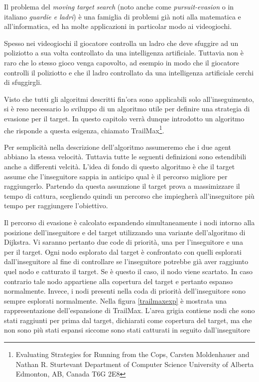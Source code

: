 \documentclass[12pt]{book}
\begin{document}
\par{Il problema del \emph{moving target search} (noto anche come \emph{pursuit-evasion} o in italiano \emph{guardie e ladri}) \`e una famiglia di problemi gi\`a noti alla matematica e all'informatica, ed ha molte applicazioni in particolar modo ai videogiochi.
}
\par{Spesso nei videogiochi il giocatore controlla un ladro che deve sfuggire ad un poliziotto a sua volta controllato da una intelligenza artificiale. Tuttavia non \`e raro che lo stesso gioco venga capovolto, ad esempio in modo che il giocatore controlli il poliziotto e che il ladro controllato da una intelligenza artificiale cerchi di sfuggirgli.}
\par{Visto che tutti gli algoritmi descritti fin'ora sono applicabili solo all'inseguimento, si \`e reso necessario lo sviluppo di un algoritmo utile per definire una strategia di evasione per il target. In questo capitolo verr\`a dunque introdotto un algoritmo che risponde a questa esigenza, chiamato TrailMax\footnote{Evaluating Strategies for Running from the Cops, Carsten Moldenhauer
and
Nathan R. Sturtevant
Department of Computer Science
University of Alberta
Edmonton, AB, Canada T6G 2E8}.
}\par{Per semplicit\`a nella descrizione dell'algoritmo assumeremo che i due agent abbiano la stessa velocit\`a. Tuttavia tutte le seguenti definizioni sono estendibili anche a differenti velcit\`a. L'idea di fondo di questo algoritmo \`e che il target assume che l'inseguitore sappia in anticipo qual \`e il percorso migliore per raggiungerlo. Partendo da questa assunzione il target prova a massimizzare il tempo di cattura, scegliendo quindi un percorso che impiegher\`a all'inseguitore pi\`u tempo per raggiungere l'obiettivo.}
\par{Il percorso di evasione \`e calcolato espandendo simultaneamente i nodi intorno alla posizione dell'inseguitore e del target utilizzando una variante dell'algoritmo di Dijkstra. Vi saranno pertanto due code di priorit\`a, una per l'inseguitore e una per il target. Ogni nodo esplorato dal target \`e confrontato con quelli esplorati dall'inseguitore al fine di controllare se l'inseguitore potrebbe gi\`a aver raggiunto quel nodo e catturato il target. Se \`e questo il caso, il nodo viene scartato. In caso contrario tale nodo appartiene alla copertura del target e pertanto espanso normalmente. Invece, i nodi presenti nella coda di priorit\`a dell'inseguitore sono sempre esplorati normalmente. Nella figura \ref{trailmaxexp} \`e mostrata una rappresentazione dell'espansione di TrailMax. L'area grigia contiene nodi che sono stati raggiunti per prima dal target, dichiarati come copertura del target, ma che non sono pi\`u stati espansi siccome sono stati catturati in seguito dall'inseguitore}
\end{document}
